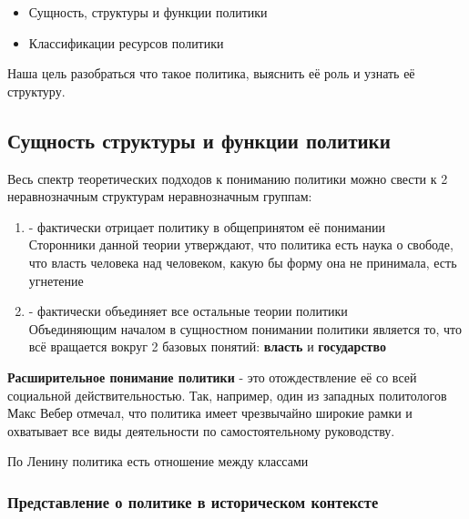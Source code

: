 \begin{itemize}
  \item Сущность, структуры и функции политики
  \item Классификации ресурсов политики
\end{itemize}

Наша цель разобраться что такое политика, выяснить её роль и узнать её структуру.

\subsection{Сущность структуры и функции политики}

Весь спектр теоретических подходов к пониманию политики можно свести к 2 неравнозначным
структурам неравнозначным группам:

\begin{enumerate}
  \item {} - фактически отрицает политику в
        общепринятом её понимании \\
        Сторонники данной теории утверждают, что политика есть наука о свободе, что
        власть человека над человеком, какую бы форму она не принимала, есть угнетение
        
  \item {} - фактически объединяет все остальные теории политики \\
        Объединяющим началом в сущностном понимании политики является то, что всё
        вращается вокруг 2 базовых понятий: \textbf{власть} и \textbf{государство}
\end{enumerate}

\textbf{Расширительное понимание политики} - это отождествление её со всей социальной
действительностью. Так, например, один из западных политологов Макс Вебер отмечал, что
политика имеет чрезвычайно широкие рамки и охватывает все виды деятельности по
самостоятельному руководству.

По Ленину политика есть отношение между классами

\subsubsection{Представление о политике в историческом контексте}

